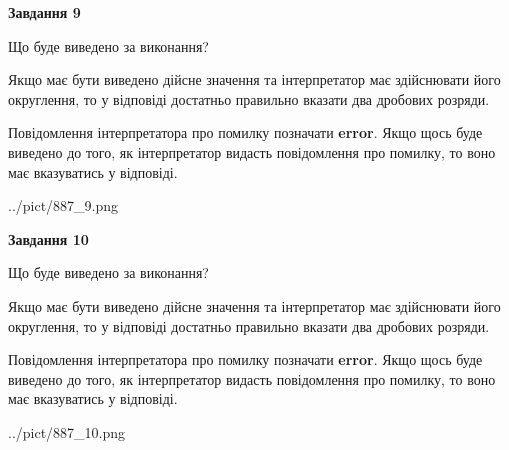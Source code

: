 \documentclass[12pt, ukrainian]{article}
\begin{document}
{\begin {Large}
{\begin {center}\textbf{Завдання 9}\end {center}}\par
Що буде виведено за виконання? \par

Якщо має бути виведено дійсне значення та інтерпретатор має здійснювати його округлення, 
то у відповіді достатньо правильно вказати два дробових розряди.

Повідомлення інтерпретатора про помилку позначати \textbf{error}.
Якщо щось буде виведено до того, як інтерпретатор видасть повідомлення про помилку, 
то воно має вказуватись у відповіді. \par

\begin{center}
	{../pict/887_9.png}
\end{center}
\newpage

{\begin {center}\textbf{Завдання 10}\end {center}}\par
Що буде виведено за виконання? \par

Якщо має бути виведено дійсне значення та інтерпретатор має здійснювати його округлення, 
то у відповіді достатньо правильно вказати два дробових розряди.

Повідомлення інтерпретатора про помилку позначати \textbf{error}.
Якщо щось буде виведено до того, як інтерпретатор видасть повідомлення про помилку, 
то воно має вказуватись у відповіді. \par

\begin{center}
	{../pict/887_10.png}
\end{center}
\newpage

\end {Large}}
\end{document}
